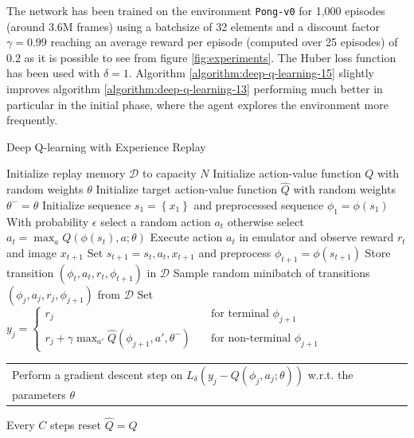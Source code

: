 \documentclass[a4paper]{article}
\makeatletter
\numberwithin{equation}{section} %
\numberwithin{figure}{section} %
\numberwithin{table}{section} %
\theoremstyle{definition}
\newcommand{\multiline}[1]{%
  \begin{tabularx}{\dimexpr\linewidth-\ALG@thistlm}[t]{@{}X@{}}
    #1
  \end{tabularx}
}
\makeatother
\begin{document}
The network has been trained on the environment \texttt{Pong-v0} for 1,000 episodes (around 3.6M frames) using a
batchsize of 32 elements and a discount factor $\gamma = 0.99$ reaching
an average reward per episode (computed over 25 episodes) of $0.2$ as it is
possible to see from figure \ref{fig:experiments}. The Huber loss function
has been used with $\delta = 1$. Algorithm
\ref{algorithm:deep-q-learning-15} slightly improves algorithm
\ref{algorithm:deep-q-learning-13} performing much better in particular in the
initial phase, where the agent explores the environment more frequently.

\begin{algorithm}
	\caption{Deep Q-learning with Experience Replay\cite{mnih2015humanlevel}}
	\label{algorithm:deep-q-learning-15}
	\begin{algorithmic}[1]
    \State Initialize replay memory $\mathcal{D}$ to capacity $N$
    \State Initialize action-value function $Q$ with random weights $\theta$
		\State Initialize target action-value function $\hat{Q}$ with random weights $\theta^- = \theta$
			\State Initialize sequence $s_1 = \left\{ x_1 \right\}$ and preprocessed sequence $\phi_1 = \phi(s_1)$
				\State With probability $\epsilon$ select a random action $a_t$
				\State otherwise select $a_t = \max_a Q(\phi(s_t), a; \theta)$
				\State Execute action $a_t$ in emulator and observe reward $r_t$ and image $x_{t+1}$
				\State Set $s_{t+1} = s_t, a_t, x_{t+1}$ and preprocess $\phi_{t+1} = \phi(s_{t+1})$
				\State Store transition $(\phi_t, a_t, r_t, \phi_{t+1})$ in $\mathcal{D}$
				\State Sample random minibatch of transitions $(\phi_j, a_j, r_j, \phi_{j+1})$ from $\mathcal{D}$
				\State Set $ y_j =
									   \begin{cases}
									     r_j       & \quad \text{for terminal } \phi_{j+1}\\
									     r_j + \gamma \max_{a'} \hat{Q}(\phi_{j+1}, a', \theta^-)  & \quad \text{for non-terminal } \phi_{j+1}
									   \end{cases}
									 $
				\State \multiline{Perform a gradient descent step on $L_{\delta}(y_j - Q(\phi_j, a_j; \theta))$ w.r.t. the parameters $\theta$}
				\State Every $C$ steps reset $\hat{Q} = Q$
			\EndFor
		\EndFor
	\end{algorithmic}
\end{algorithm}
\end{document}
